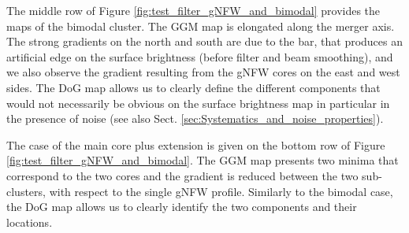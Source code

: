 \documentclass[traditabstract]{aa}
\begin{document}
The middle row of Figure \ref{fig:test_filter_gNFW_and_bimodal} provides the maps of the bimodal cluster. The GGM map is elongated along the merger axis. The strong gradients on the north and south are due to the bar, that produces an artificial edge on the surface brightness (before filter and beam smoothing), and we also observe the gradient resulting from the gNFW cores on the east and west sides. The DoG map allows us to clearly define the different components that would not necessarily be obvious on the surface brightness map in particular in the presence of noise (see also Sect. \ref{sec:Systematics_and_noise_properties}).

The case of the main core plus extension is given on the bottom row of Figure \ref{fig:test_filter_gNFW_and_bimodal}. The GGM map presents two minima that correspond to the two cores and the gradient is reduced between the two sub-clusters, with respect to the single gNFW profile. Similarly to the bimodal case, the DoG map allows us to clearly identify the two components and their locations.
\end{document}
